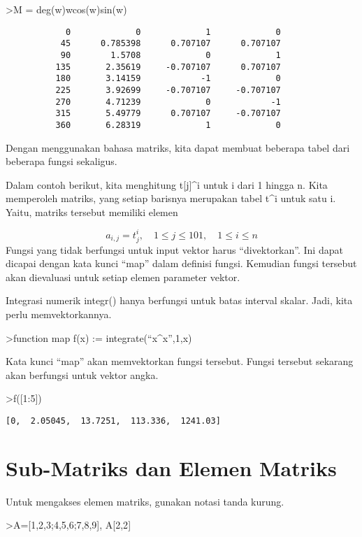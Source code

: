 \documentclass[
]{book}
\begin{document}
\textgreater M = deg(w)\textbar w\textbar cos(w)\textbar sin(w)

\begin{verbatim}
            0             0             1             0 
           45      0.785398      0.707107      0.707107 
           90        1.5708             0             1 
          135       2.35619     -0.707107      0.707107 
          180       3.14159            -1             0 
          225       3.92699     -0.707107     -0.707107 
          270       4.71239             0            -1 
          315       5.49779      0.707107     -0.707107 
          360       6.28319             1             0 
\end{verbatim}

Dengan menggunakan bahasa matriks, kita dapat membuat beberapa tabel dari beberapa fungsi sekaligus.

Dalam contoh berikut, kita menghitung t{[}j{]}\^{}i untuk i dari 1 hingga n. Kita memperoleh matriks, yang setiap barisnya merupakan tabel t\^{}i untuk satu i. Yaitu, matriks tersebut memiliki elemen

\[a_{i,j} = t_j^i, \quad 1 \le j \le 101, \quad 1 \le i \le n\]Fungsi yang tidak berfungsi untuk input vektor harus ``divektorkan''. Ini dapat dicapai dengan kata kunci ``map'' dalam definisi fungsi. Kemudian fungsi tersebut akan dievaluasi untuk setiap elemen parameter vektor.

Integrasi numerik integr() hanya berfungsi untuk batas interval skalar. Jadi, kita perlu memvektorkannya.

\textgreater function map f(x) := integrate(``x\^{}x'',1,x)

Kata kunci ``map'' akan memvektorkan fungsi tersebut. Fungsi tersebut sekarang akan berfungsi untuk vektor angka.

\textgreater f({[}1:5{]})

\begin{verbatim}
[0,  2.05045,  13.7251,  113.336,  1241.03]
\end{verbatim}

\chapter{Sub-Matriks dan Elemen Matriks}\label{sub-matriks-dan-elemen-matriks}

Untuk mengakses elemen matriks, gunakan notasi tanda kurung.

\textgreater A={[}1,2,3;4,5,6;7,8,9{]}, A{[}2,2{]}
\end{document}

